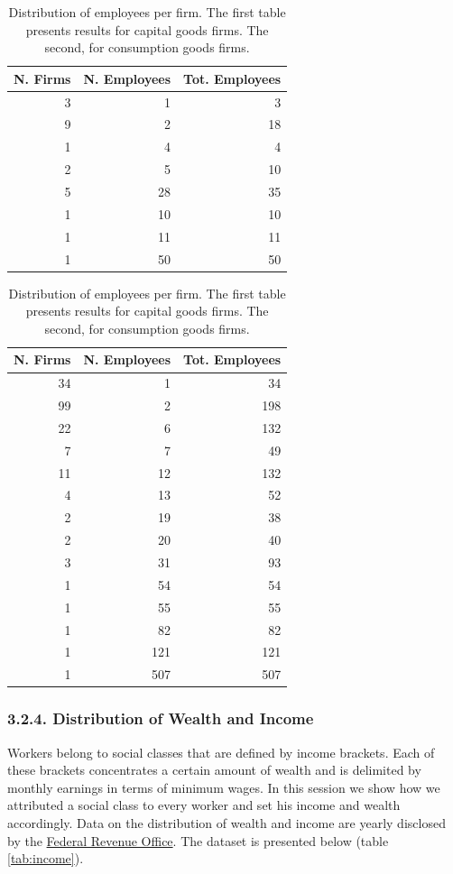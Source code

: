 \documentclass[11pt,]{article}
\begin{document}
\begin{table}
\caption{\label{tab:unnamed-chunk-15}\label{tab:dist.cap}Distribution of employees per firm. The first table presents results for capital goods firms. The second, for consumption goods firms.}

\centering
\begin{tabular}[t]{rrr}
\toprule
N. Firms & N. Employees & Tot. Employees\\
\midrule
3 & 1 & 3\\
9 & 2 & 18\\
1 & 4 & 4\\
2 & 5 & 10\\
5 & 28 & 35\\
1 & 10 & 10\\
1 & 11 & 11\\
1 & 50 & 50\\
\bottomrule
\end{tabular}
\centering
\begin{tabular}[t]{rrr}
\toprule
N. Firms & N. Employees & Tot. Employees\\
\midrule
34 & 1 & 34\\
99 & 2 & 198\\
22 & 6 & 132\\
7 & 7 & 49\\
11 & 12 & 132\\
4 & 13 & 52\\
2 & 19 & 38\\
2 & 20 & 40\\
3 & 31 & 93\\
1 & 54 & 54\\
1 & 55 & 55\\
1 & 82 & 82\\
1 & 121 & 121\\
1 & 507 & 507\\
\bottomrule
\end{tabular}
\end{table}

\subsubsection{3.2.4. Distribution of Wealth and
Income}\label{distribution-of-wealth-and-income}

Workers belong to social classes that are defined by income brackets.
Each of these brackets concentrates a certain amount of wealth and is
delimited by monthly earnings in terms of minimum wages. In this session
we show how we attributed a social class to every worker and set his
income and wealth accordingly. Data on the distribution of wealth and
income are yearly disclosed by the
\href{https://idg.receita.fazenda.gov.br/dados/receitadata/estudos-e-tributarios-e-aduaneiros/estudos-e-estatisticas/11-08-2014-grandes-numeros-dirpf/grandes-numeros-dirpf-capa}{Federal
Revenue Office}. The dataset is presented below (table
\ref{tab:income}).
\end{document}
